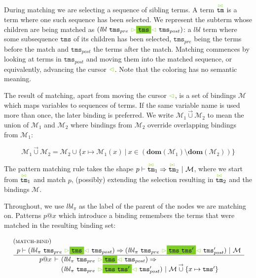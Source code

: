 \documentclass{article}
\makeatletter
\newcommand{\rulename}{\textsc}
\newcommand{\irule}[3]{\begin{array}{l}{~\small\mbox{(\rulename{#1})}}\\\;\frac{\begin{array}{c}#2\end{array}}{\begin{array}{l}#3\end{array}}\end{array}}
\newcommand{\cursorColor}{LimeGreen}
\newcommand{\lbl}{\ensuremath{\mathit{lbl}}}
\newcommand{\tm}{\ensuremath{\mathtt{tm}}}
\newcommand{\tms}{\ensuremath{\mathtt{tms}}}
\newcommand{\Tmc}{\ensuremath{\overset{ \textcolor{\cursorColor}{\bowtie}}{\tm}}}
\newcommand{\mstart}{\ensuremath{\textcolor{\cursorColor}{\rhd}}}
\newcommand{\mend}{\ensuremath{\textcolor{\cursorColor}{\lhd}}}
\newcommand{\bindings}{\ensuremath{\mathcal{M}}}
\newcommand{\extend}[2]{\ensuremath{#1\overset{\rightarrow}{\cup}#2}}
\newcommand{\select}[1]{\mstart\colorbox{\cursorColor}{$#1$}\mend}
\newcommand{\matches}[4]{\ensuremath{#1 \vdash #2 \Rightarrow #3 ~|~ #4}}
\newcommand{\xmatches}[4]{\ensuremath{
    \begin{array}{r@{\hspace{4pt}}c@{\hspace{4pt}}l}%
      #1 & \vdash & #2 \Rightarrow\\
         &        & #3 ~|~ #4
    \end{array}}}
\newcommand{\pseq}[2]{\ensuremath{#1 \cdot #2}}
\newcommand{\por}[2]{\ensuremath{#1/#2}}
\newcommand{\children}[2]{\ensuremath{#1} \Downarrow #2}
\newcommand{\pnot}[1]{\ensuremath{\lnot #1}}
\newcommand{\maybe}[1]{\ensuremath{#1?}}
\newcommand{\many}[1]{\ensuremath{#1^*}}
\newcommand{\any}{\ensuremath{\text{\underline{\hspace{0.6em}}}}}
\newcommand{\bind}[2]{\ensuremath{#1@#2}}
\makeatother
\begin{document}
During matching we are selecting a sequence of sibling terms. A
term \Tmc{} is a term where one such sequence has been selected.
We represent the subterm whose children are being matched as
$(\lbl~\tms_{pre}~\select{\tms}~\tms_{post})$: a $\lbl$ term
where some subsequence $\tms$ of its children has been selected,
$\tms_{pre}$ being the terms before the match and $\tms_{post}$
the terms after the match. Matching commences by looking at terms
in $\tms_{post}$ and moving them into the matched sequence, or
equivalently, advancing the cursor $\mend$. Note that the coloring
has no semantic meaning.

The result of matching, apart from moving the cursor $\mend$, is a
set of bindings $\bindings$ which maps variables to sequences of
terms.
%
If the same variable name is used more than once, the later
binding is preferred. We write $\extend{\bindings_1}{\bindings_2}$
to mean the union of $\bindings_1$ and $\bindings_2$ where
bindings from $\bindings_2$ override overlapping bindings from
$\bindings_1$:

\[
    \extend{\bindings_1}{\bindings_2} = \bindings_2\cup \{x\mapsto \bindings_1(x) ~|~ x \in (\mathbf{dom}(\bindings_1)\setminus\mathbf{dom}(\bindings_2))\}
\]

The pattern matching rule takes the shape
$\matches{p}{\Tmc_1}{\Tmc_2}{\bindings}$, where we start from
$\Tmc_1$ and match $p$, (possibly) extending the selection
resulting in $\Tmc_2$ and the bindings $\bindings$.

Throughout, we use $\lbl_\pi$ as the label of the parent of the
nodes we are matching on.
%
Patterns $\bind{p}{x}$ which introduce a binding remembers the
terms that were matched in the resulting binding set:

\[
  \begin{array}{c}
    \irule{match-bind}{
    \matches{p}{(\lbl_\pi~\tms_{pre}~\select{\tms}~\tms_{post})}
               {(\lbl_\pi~\tms_{pre}~\select{\tms~\tms'}~\tms'_{post})}{\bindings}
    }{
    \xmatches{\bind{p}{x}}
    {(\lbl_\pi~\tms_{pre}~\select{\tms}~\tms_{post})}
    {(\lbl_\pi~\tms_{pre}~\select{\tms~\tms'}~\tms'_{post})}{\extend{\bindings} \{x\mapsto\tms'\}}
    }
  \end{array}
\]


\end{document}
